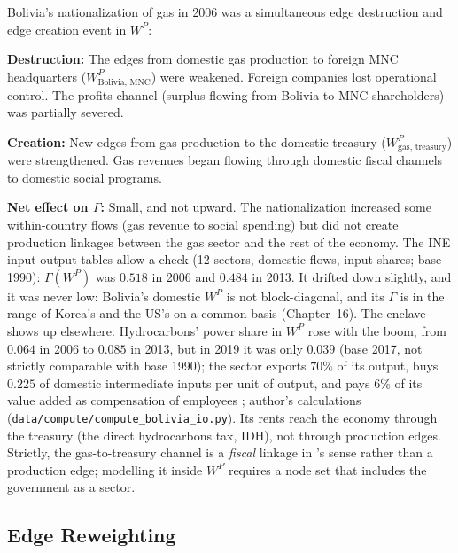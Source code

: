 \documentclass[../structural_economics_book.tex]{subfiles}
\begin{document}
\begin{example}\label{ch13:ex:gas}
Bolivia's nationalization of gas in 2006 was a simultaneous edge destruction and edge creation event in $W^P$:

\textbf{Destruction:} The edges from domestic gas production to foreign MNC headquarters ($W^P_{\text{Bolivia, MNC}}$) were weakened. Foreign companies lost operational control. The profits channel (surplus flowing from Bolivia to MNC shareholders) was partially severed.

\textbf{Creation:} New edges from gas production to the domestic treasury ($W^P_{\text{gas, treasury}}$) were strengthened. Gas revenues began flowing through domestic fiscal channels to domestic social programs.

\textbf{Net effect on $\Gamma$:} Small, and not upward. The nationalization increased some within-country flows (gas revenue to social spending) but did not create production linkages between the gas sector and the rest of the economy. The INE input-output tables allow a check (12 sectors, domestic flows, input shares; base 1990): $\Gamma(W^P)$ was $0.518$ in 2006 and $0.484$ in 2013. It drifted down slightly, and it was never low: Bolivia's domestic $W^P$ is not block-diagonal, and its $\Gamma$ is in the range of Korea's and the US's on a common basis (Chapter~16). The enclave shows up elsewhere. Hydrocarbons' power share in $W^P$ rose with the boom, from $0.064$ in 2006 to $0.085$ in 2013, but in 2019 it was only $0.039$ (base 2017, not strictly comparable with base 1990); the sector exports $70\%$ of its output, buys $0.225$ of domestic intermediate inputs per unit of output, and pays $6\%$ of its value added as compensation of employees \citep{ine2026sut}; author's calculations (\texttt{data/compute/compute\_bolivia\_io.py}). Its rents reach the economy through the treasury (the direct hydrocarbons tax, IDH), not through production edges. Strictly, the gas-to-treasury channel is a \emph{fiscal} linkage in \citeauthor{hirschman1977generalized}'s \citeyearpar{hirschman1977generalized} sense rather than a production edge; modelling it inside $W^P$ requires a node set that includes the government as a sector.
\end{example}


\subsection{Edge Reweighting}
\end{document}
